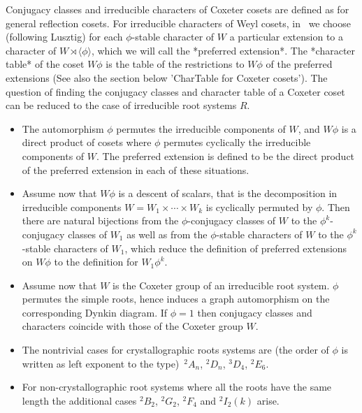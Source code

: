 Conjugacy  classes and irreducible characters of Coxeter cosets are defined
as  for  general  reflection  cosets.  For  irreducible  characters of Weyl
cosets,  in \CHEVIE\ we  choose (following Lusztig)  for each $\phi$-stable
character  of $W$ a particular extension to a character of $W\rtimes\langle
\phi \rangle$, which we will call the *preferred extension*. The *character
table*  of the coset $W\phi$ is the table of the restrictions to $W\phi$ of
the preferred extensions (See also the section below 'CharTable for Coxeter
cosets'). The question of finding the conjugacy classes and character table
of  a Coxeter coset can be reduced  to the case of irreducible root systems
$R$.

\begin{itemize}
\item  The automorphism $\phi$ permutes  the irreducible components of $W$,
and  $W\phi$ is a direct product of cosets where $\phi$ permutes cyclically
the irreducible components of $W$. The preferred extension is defined to be
the direct product of the preferred extension in each of these situations.

\item  Assume  now  that  $W\phi$  is  a  descent  of  scalars, that is the
decomposition  in irreducible components $W=W_1\times \cdots \times W_k$ is
cyclically  permuted by $\phi$. Then there  are natural bijections from the
$\phi$-conjugacy  classes of $W$ to the $\phi^k$-conjugacy classes of $W_1$
as  well as from the $\phi$-stable characters of $W$ to the $\phi^k$-stable
characters of $W_1$, which reduce the definition of preferred extensions on
$W\phi$ to the definition for $W_1\phi^k$.

\item  Assume now  that $W$  is the  Coxeter group  of an  irreducible root
system.   $\phi$  permutes  the   simple  roots,  hence   induces  a  graph
automorphism   on  the  corresponding  Dynkin  diagram.  If  $\phi=1$  then
conjugacy  classes and characters coincide with  those of the Coxeter group
$W$.

\item The nontrivial cases for crystallographic roots systems are (the order
of  $\phi$ is  written as  left exponent  to the type)\:\ $^2A_n$, $^2D_n$,
$^3D_4$, $^2E_6$.

\item  For non-crystallographic root  systems where all  the roots have the
same  length the additional cases  $^2B_2$, $^2G_2$, $^2F_4$ and $^2I_2(k)$
arise.


\end{itemize}
